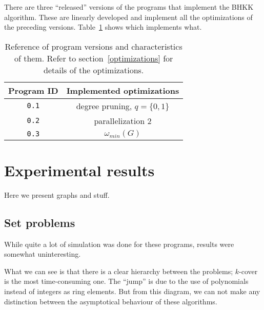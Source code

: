 \documentclass{cslthse-msc}
\newcommand{\code}{\texttt}
\begin{document}
There are three ``released'' versions of the programs that implement the BHKK algorithm. These are linearly developed and implement all the optimizations of the preceding versions. Table~\ref{versions} shows which implements what.

\begin{table}[t]\centering
 \begin{tabular}{c|c} \hline
  Program ID & Implemented optimizations \\ \hline
  \code{0.1} & degree pruning, $q = \{0, 1\}$ \\ \hline
  \code{0.2} & parallelization 2 \\ \hline
  \code{0.3} & $\omega_{min}(G)$ \\ \hline
 \end{tabular}
 \caption{Reference of program versions and characteristics of them. Refer to section~\ref{optimizations} for details of the optimizations.}
 \label{versions}
\end{table}


\chapter{Experimental results}
Here we present graphs and stuff.

\section{Set problems}
While quite a lot of simulation was done for these programs, results were somewhat uninteresting. 



What we can see is that there is a clear hierarchy between the problems; $k$-cover is the most time-consuming one. The ``jump'' is due to the use of polynomials instead of integers as ring elements. But from this diagram, we can not make any distinction between the asymptotical behaviour of these algorithms.
\end{document}
